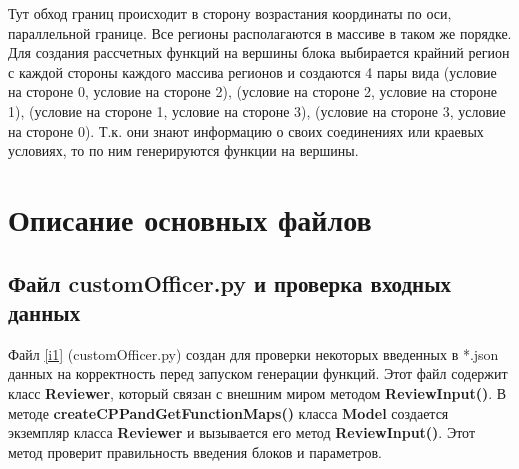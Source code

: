 \documentclass[a4paper]{article}
\begin{document}
Тут обход границ происходит в сторону возрастания координаты по оси, па\-рал\-лель\-ной границе. Все регионы располагаются в массиве в таком же порядке. Для создания рассчетных функций на вершины блока выбирается крайний регион с каж\-дой стороны каждого массива регионов и создаются 4 пары вида (условие на стороне 0, условие на стороне 2), (условие на стороне 2, условие на стороне 1), (условие на стороне 1, условие на стороне 3), (условие на стороне 3, условие на стороне 0). Т.к. они знают информацию о своих соединениях или краевых условиях, то по ним генерируются функции на вершины.


\newpage
\section{\LARGE{Описание основных файлов}}
\subsection{\Large Файл customOfficer.py и проверка входных данных}
Файл \ref{i1} (customOfficer.py) создан для проверки некоторых введенных в *.json данных на корректность перед запуском генерации функций. Этот файл содержит класс {\bf Reviewer}, который связан с внешним миром методом {\bf ReviewInput()}. В методе {\bf createCPPandGetFunctionMaps()} класса {\bf Model} создается экземпляр класса {\bf Reviewer} и вызывается его метод {\bf ReviewInput()}. Этот метод проверит правильность введения бло\-ков и параметров.
\end{document}
